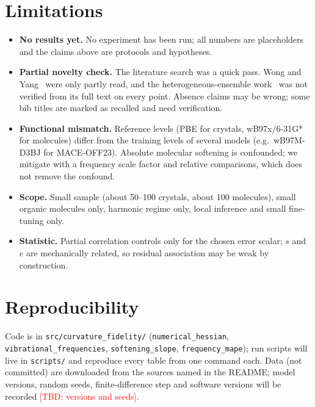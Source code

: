 \documentclass{article}
\newcommand{\TBD}[1]{\textcolor{red}{[TBD: #1]}}
\newcommand{\sfs}{s}      %
\begin{document}
\section{Limitations}
\begin{itemize}
\item \textbf{No results yet.} No experiment has been run; all numbers are placeholders and the claims above are protocols and hypotheses.
\item \textbf{Partial novelty check.} The literature search was a quick pass. Wong and Yang~\cite{wong2026bias} were only partly read, and the heterogeneous-ensemble work~\cite{hetero2025} was not verified from its full text on every point. Absence claims may be wrong; some bib titles are marked as recalled and need verification.
\item \textbf{Functional mismatch.} Reference levels (PBE for crystals, wB97x/6-31G* for molecules) differ from the training levels of several models (e.g.\ wB97M-D3BJ for MACE-OFF23). Absolute molecular softening is confounded; we mitigate with a frequency scale factor and relative comparisons, which does not remove the confound.
\item \textbf{Scope.} Small sample (about 50--100 crystals, about 100 molecules), small organic molecules only, harmonic regime only, local inference and small fine-tuning only.
\item \textbf{Statistic.} Partial correlation controls only for the chosen error scalar; $\sfs$ and $e$ are mechanically related, so residual association may be weak by construction.
\end{itemize}

\section{Reproducibility}
Code is in \texttt{src/curvature\_fidelity/} (\texttt{numerical\_hessian}, \texttt{vibrational\_frequencies}, \texttt{softening\_slope}, \texttt{frequency\_mape}); run scripts will live in \texttt{scripts/} and reproduce every table from one command each. Data (not committed) are downloaded from the sources named in the README; model versions, random seeds, finite-difference step and software versions will be recorded \TBD{versions and seeds}.



\end{document}
